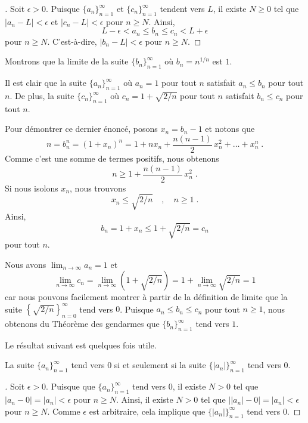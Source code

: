 {\begin{proof}[\theory]
Soit $\epsilon>0$.  Puisque $\displaystyle \{ a_n\}_{n=1}^\infty$ et
$\displaystyle \{c_n\}_{n=1}^\infty$ tendent vers $L$, il existe $N\geq 0$
tel que $|a_n-L|<\epsilon$ et $|c_n - L|<\epsilon$ pour $n\geq N$.  Ainsi,
\[
L-\epsilon < a_n \leq b_n \leq c_n < L+\epsilon
\]
pour $n\geq N$.  C'est-à-dire, $|b_n-L|<\epsilon$ pour $n\geq N$.
\end{proof}

\begin{egg}[\theory\ \eng]
Montrons que la limite de la suite
$\displaystyle \{ b_n\}_{n=1}^\infty$ où $b_n = n^{1/n}$ est $1$.

Il est clair que la suite
$\displaystyle \{ a_n\}_{n=1}^\infty$ où $a_n = 1$ pour tout
$n$ satisfait $a_n \leq b_n$ pour tout $n$.  De plus, la suite
$\displaystyle \{ c_n\}_{n=1}^\infty$ où $c_n = 1+\sqrt{2/n}$ pour
tout $n$ satisfait $b_n \leq  c_n$ pour tout $n$.

Pour démontrer ce dernier énoncé, posons $x_n = b_n-1$ et
notons que
\[
n = b_n^n = (1+x_n)^n
= 1 + nx_n + \frac{n(n-1)}{2}\,x_n^2 + \ldots + x_n^n \; .
\]
Comme c'est une somme de termes positifs, nous obtenons
\[
n \geq 1 + \frac{n(n-1)}{2}\,x_n^2 \; .
\]
Si nous isolons $x_n$, nous trouvons
\[
x_n \leq \sqrt{2/n} \quad , \quad n \geq 1 \; .
\]
Ainsi,
\[
b_n = 1 + x_n \leq 1 + \sqrt{2/n} = c_n
\]
pour tout $n$.

Nous avons $\displaystyle \lim_{n\rightarrow \infty} a_n = 1$ et
\[
\lim_{n\rightarrow \infty} c_n = \lim_{n\rightarrow \infty}
\left(1+ \sqrt{2/n} \right) = 1 + \lim_{n\rightarrow \infty} \sqrt{2/n} = 1
\]
car nous pouvons facilement montrer à partir de la définition de limite que
la suite $\displaystyle \left\{ \sqrt{2/n} \right\}_{n=0}^\infty$ tend
vers $0$.  Puisque $a_n \leq b_n \leq c_n$ pour tout $n \geq 1$, nous
obtenons du Théorème des gendarmes que
$\displaystyle \{ b_n\}_{n=1}^\infty$ tend vers $1$.
\end{egg}

Le résultat suivant est quelques fois utile.

\begin{focus}{\thm}
La suite $\displaystyle \{ a_n\}_{n=1}^\infty$ tend vers $0$ si et
seulement si la suite $\displaystyle \{ |a_n| \}_{n=1}^\infty$ tend vers
$0$. \label{suiteAbs}
\end{focus}

\begin{proof}[\theory]
\subQ{$\Rightarrow$} Soit $\epsilon>0$. Puisque que
$\displaystyle \{ a_n\}_{n=1}^\infty$ 
tend vers $0$, il existe $N>0$ tel que $|a_n- 0 | = |a_n| <\epsilon$
pour $n\geq N$.  Ainsi, il existe $N>0$ tel que
$\big| |a_n|- 0 \big| = |a_n| <\epsilon$ pour $n\geq N$.  Comme
$\epsilon$ est arbitraire, cela implique que
$\displaystyle \{|a_n|\}_{n=1}^\infty$ tend vers $0$.


\end{proof}}
